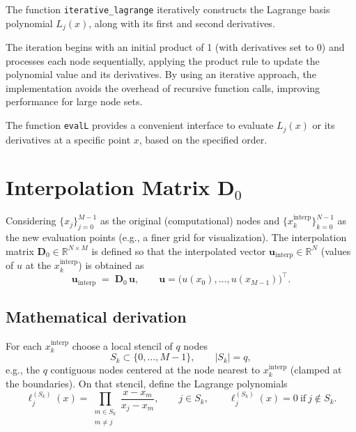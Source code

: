 The function \texttt{iterative\_lagrange} iteratively constructs the Lagrange basis polynomial \( L_j(x) \), along with its first and second derivatives.

The iteration begins with an initial product of 1 (with derivatives set to 0) and processes each node sequentially, applying the product rule to update the polynomial value and its derivatives. By using an iterative approach, the implementation avoids the overhead of recursive function calls, improving performance for large node sets.

The function \texttt{evalL} provides a convenient interface to evaluate \( L_j(x) \) or its derivatives at a specific point \( x \), based on the specified order.

\clearpage

\section{Interpolation Matrix \texorpdfstring{$\mathbf{D}_0$}{D0}}
\label{sec:interp_matrix_D0}


Considering \(\{x_j\}_{j=0}^{M-1}\) as the original (computational) nodes and \(\{x^{\text{interp}}_k\}_{k=0}^{N-1}\) as the new evaluation points
(e.g., a finer grid for visualization). The interpolation matrix
\(\mathbf{D}_0 \in \mathbb{R}^{N\times M}\) is defined so that the interpolated vector
\(\mathbf{u}_{\text{interp}} \in \mathbb{R}^{N}\) (values of \(u\) at the \(x^{\text{interp}}_k\)) is obtained as
\begin{equation}
\mathbf{u}_{\text{interp}} \;=\; \mathbf{D}_0\,\mathbf{u},
\qquad
\mathbf{u} = \big(u(x_0),\dots,u(x_{M-1})\big)^\top.
\end{equation}


\subsection*{Mathematical derivation}
For each \(x^{\text{interp}}_k\) choose a local stencil of \(q\) nodes
\[
S_k \subset \{0,\dots,M-1\}, \qquad |S_k| = q,
\]
e.g., the \(q\) contiguous nodes centered at the node nearest to \(x^{\text{interp}}_k\) (clamped at the boundaries).
On that stencil, define the Lagrange polynomials
\begin{equation}
\ell^{(S_k)}_j(x)
=
\prod_{\substack{m \in S_k\\ m\neq j}}
\frac{x - x_m}{x_j - x_m},
\qquad j \in S_k,
\qquad
\ell^{(S_k)}_j(x) = 0 \ \text{if}\ j \notin S_k.
\label{eq:lagrange_local}
\end{equation}


